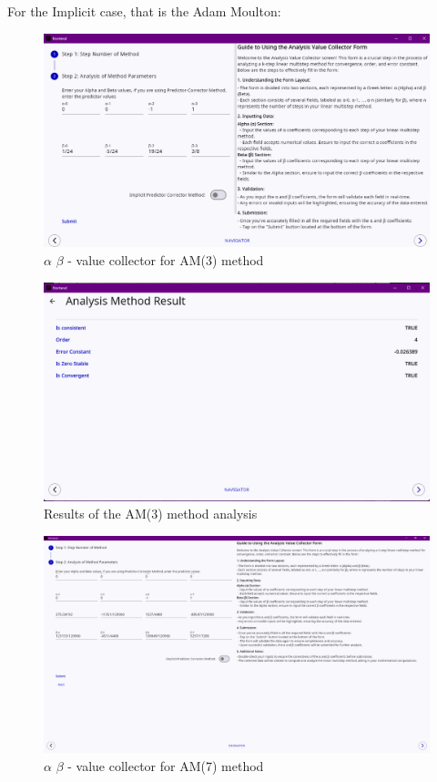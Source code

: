 \documentclass[a4paper, twoside]{report} %
\begin{document}
	For the Implicit case, that is the Adam Moulton:

	\begin{figure}[htbp]
		\centering
		\includegraphics[width=1\textwidth]{chapters/4/image/am(3)a.png}
		\caption{$\alpha$ $\beta$ - value collector for AM(3) method}
	\end{figure}

	\begin{figure}[htbp]
		\centering
		\includegraphics[width=1\textwidth]{chapters/4/image/am(3)b.png}
		\caption{Results of the AM(3) method analysis}
	\end{figure}

	\begin{figure}[htbp]
		\centering
		\includegraphics[width=1\textwidth]{chapters/4/image/am(7)a.png}
		\caption{$\alpha$ $\beta$ - value collector for AM(7) method}
	\end{figure}
\end{document}
